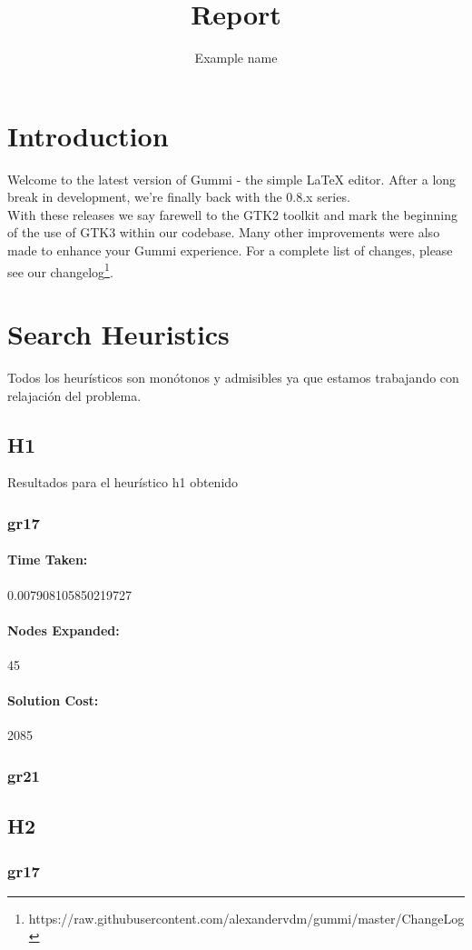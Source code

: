 \documentclass[11pt]{article}
\title{\textbf{Report}}
\author{Example name}
\date{}
\begin{document}
\maketitle
\thispagestyle{empty}

\section{Introduction}
Welcome to the latest version of Gummi - the simple {\LaTeX} editor. After a long break in development, we're finally back with the 0.8.x series.\\
With these releases we say farewell to the GTK2 toolkit and mark the beginning of the use of GTK3 within our codebase. Many other improvements were also made to enhance your Gummi experience. For a complete list of changes, please see our changelog\footnote{https://raw.githubusercontent.com/alexandervdm/gummi/master/ChangeLog}. 
\section{Search Heuristics}
Todos los heurísticos son monótonos y admisibles ya que estamos trabajando con relajación del problema.
\subsection{H1}
Resultados para el heurístico h1 obtenido
\subsubsection{gr17}
\paragraph{Time Taken:}0.007908105850219727
\paragraph{Nodes Expanded:}45
\paragraph{Solution Cost:}2085
\subsubsection{gr21}
\subsection{H2}
\subsubsection{gr17}
\end{document}
